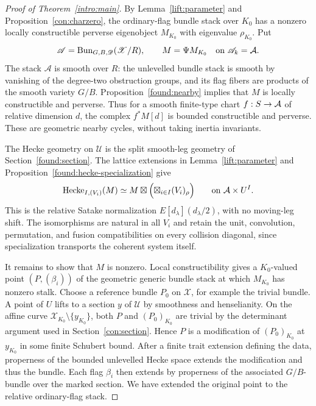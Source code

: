 \begin{proof}[Proof of Theorem~\ref{intro:main}]\label{lift:main-proof}
By Lemma~\ref{lift:parameter} and Proposition~\ref{con:charzero},
the ordinary-flag bundle stack over $K_0$ has a nonzero locally
constructible perverse eigenobject $M_{K_0}$ with eigenvalue
$\rho_{K_0}$.  Put
\[
 \mathscr A=\operatorname{Bun}_{G,B,\mathscr D}(\mathscr X/R),\qquad
                  M=\Psi M_{K_0}\quad\text{on }\mathscr A_k=\mathcal A.
\]
The stack $\mathscr A$ is smooth over $R$: the unlevelled bundle
stack is smooth by vanishing of the degree-two obstruction groups,
and its flag fibers are products of the smooth variety $G/B$.
Proposition~\ref{found:nearby} implies that $M$ is locally
constructible and perverse.  Thus for a smooth finite-type chart
$f:S\to\mathcal A$ of relative dimension $d$, the complex $f^*M[d]$ is
bounded constructible and perverse.  These are geometric nearby
cycles, without taking inertia invariants.

The Hecke geometry on $\mathscr U$ is the split smooth-leg geometry
of Section~\ref{found:section}.  The lattice extensions in
Lemma~\ref{lift:parameter} and
Proposition~\ref{found:hecke-specialization} give
\begin{equation}\label{lift:final-eigenmaps}
 \operatorname{Hecke}_{I,(V_i)}(M)\simeq
 M\boxtimes\Bigl(\boxtimes_{i\in I}(V_i)_\rho\Bigr)
 \qquad\text{on }\mathcal A\times U^I.
\end{equation}
This is the relative Satake normalization
$E[d_\lambda](d_\lambda/2)$, with no moving-leg shift.  The
isomorphisms are natural in all $V_i$ and retain the unit,
convolution, permutation, and fusion compatibilities on every
collision diagonal, since specialization transports the coherent
system itself.

It remains to show that $M$ is nonzero.  Local constructibility gives
a $K_0$-valued point $(P,(\beta_i))$ of the geometric generic bundle
stack at which $M_{K_0}$ has nonzero stalk.  Choose a reference
bundle $P_0$ on $\mathscr X$, for example the trivial bundle.
A point of $U$ lifts to a section $y$ of $\mathscr U$ by
smoothness and henselianity.  On the affine curve
$\mathscr X_{K_0}\setminus\{y_{K_0}\}$, both $P$ and $(P_0)_{K_0}$
are trivial by the determinant argument used in
Section~\ref{con:section}.  Hence $P$ is a modification of
$(P_0)_{K_0}$ at $y_{K_0}$ in some finite Schubert bound.  After
a finite trait extension defining the data, properness of the
bounded unlevelled Hecke space extends the modification and thus
the bundle.  Each flag $\beta_i$ then extends by properness of the
associated $G/B$-bundle over the marked section.  We have extended
the original point to the relative ordinary-flag stack.


\end{proof}
